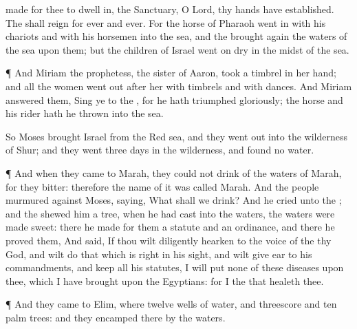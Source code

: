 {made for thee to dwell
in,
{} the
Sanctuary, O
Lord,
{} thy
hands have
established.
The
{} shall
reign for
ever and
ever.
For the
horse of
Pharaoh went
in with his
chariots and with his
horsemen into the
sea, and the
{} brought
again the
waters of the
sea upon them; but the
children of
Israel
went on
dry
{} in the
midst of the
sea.
\par }{\PP {}¶ And
Miriam the
prophetess, the
sister of
Aaron,
took a
timbrel in her
hand; and all the
women went
out
after her with
timbrels and with
dances.
And
Miriam
answered them,
Sing ye to the
{}, for he hath
triumphed
gloriously; the
horse and his
rider hath he
thrown into the
sea.
\par }{\PP {}So
Moses
brought
Israel from the
Red
sea, and they went
out into the
wilderness of
Shur; and they
went
three
days in the
wilderness, and
found no
water.
\par }{\PP {}¶ And when they
came to
Marah, they
could not
drink of the
waters of
Marah, for they
{}
bitter: therefore the
name of it was
called
Marah.
And the
people
murmured against
Moses,
saying, What shall we
drink?
And he
cried unto the
{}; and the
{}
shewed him a
tree,
{} when he had
cast into the
waters, the
waters were made
sweet: there he
made for them a
statute and an
ordinance, and there he
proved them,
And
said, If thou wilt
diligently
hearken to the
voice of the
{} thy
God, and wilt
do that which is
right in his
sight, and wilt give
ear to his
commandments, and
keep all his
statutes, I will
put none of these
diseases upon thee, which I have
brought upon the
Egyptians: for I
{} the
{} that
healeth thee.
\par }{\PP {}¶ And they
came to
Elim, where
{}
twelve
wells of
water, and threescore and
ten palm
trees: and they
encamped there by the
waters.

}
